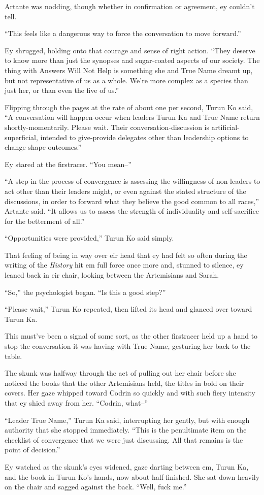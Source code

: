 Artante was nodding, though whether in confirmation or agreement, ey couldn't tell.

``This feels like a dangerous way to force the conversation to move forward.''

Ey shrugged, holding onto that courage and sense of right action. ``They deserve to know more than just the synopses and sugar-coated aspects of our society. The thing with Answers Will Not Help is something she and True Name dreamt up, but not representative of us as a whole. We're more complex as a species than just her, or than even the five of us.''

Flipping through the pages at the rate of about one per second, Turun Ko said, ``A conversation will happen-occur when leaders Turun Ka and True Name return shortly-momentarily. Please wait. Their conversation-discussion is artificial-superficial, intended to give-provide delegates other than leadership options to change-shape outcomes.''

Ey stared at the firstracer. ``You mean--''

``A step in the process of convergence is assessing the willingness of non-leaders to act other than their leaders might, or even against the stated structure of the discussions, in order to forward what they believe the good common to all races,'' Artante said. ``It allows us to assess the strength of individuality and self-sacrifice for the betterment of all.''

``Opportunities were provided,'' Turun Ko said simply.

That feeling of being in way over eir head that ey had felt so often during the writing of the \emph{History} hit em full force once more and, stunned to silence, ey leaned back in eir chair, looking between the Artemisians and Sarah.

``So,'' the psychologist began. ``Is this a good step?''

``Please wait,'' Turun Ko repeated, then lifted its head and glanced over toward Turun Ka.

This must've been a signal of some sort, as the other firstracer held up a hand to stop the conversation it was having with True Name, gesturing her back to the table.

The skunk was halfway through the act of pulling out her chair before she noticed the books that the other Artemisians held, the titles in bold on their covers. Her gaze whipped toward Codrin so quickly and with such fiery intensity that ey shied away from her. ``Codrin, what--''

``Leader True Name,'' Turun Ka said, interrupting her gently, but with enough authority that she stopped immediately. ``This is the penultimate item on the checklist of convergence that we were just discussing. All that remains is the point of decision.''

Ey watched as the skunk's eyes widened, gaze darting between em, Turun Ka, and the book in Turun Ko's hands, now about half-finished. She sat down heavily on the chair and sagged against the back. ``Well, fuck me.''
